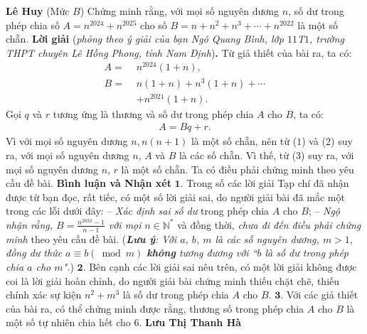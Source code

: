 \begin{multicols}{2}
	\hfill	\textbf{\color{thachthuctoanhoc}Lê Huy}
	\vskip 0.1cm
	{}
	(Mức $B$) Chứng minh rằng, với mọi số nguyên dương $n$, số dư trong phép chia số $A=n^{2024}+n^{2025}$  cho số $B=n+n^2+n^3+\cdots+n^{2022}$ là một số chẵn. 
	\vskip 0.05cm
	\textbf{\color{thachthuctoanhoc}Lời giải} (\textit{phỏng theo ý giải của bạn Ngô Quang Bình, lớp $11$T$1$, trường THPT chuyên Lê Hồng Phong, tỉnh Nam Định})\textbf{\color{thachthuctoanhoc}.}
	\vskip 0.05cm
	Từ giả thiết của bài ra, ta có:
	\begin{align*}
		A = \,\,&{n^{2024}}\left( {1 + n} \right), \tag{$1$}\\
		B = \,\,&n\left( {1 + n} \right) + {n^3}\left( {1 + n} \right) +  \cdots  \\
		&+ {n^{2021}}\left( {1 + n} \right). \tag{$2$}
	\end{align*}
	Gọi $q$ và $r$ tương ứng là thương và số dư trong phép chia $A$ cho $B$, ta có:
	\begin{align*}
		A = Bq + r. \tag{$3$}
	\end{align*}
	Vì với mọi số nguyên dương $n, n(n + 1)$ là một số chẵn, nên từ ($1$) và ($2$) suy ra, với mọi số nguyên dương $n$, $A$ và $B$ là các số chẵn. Vì thế, từ ($3$) suy ra, với mọi số nguyên dương $n$, $r$ là một số chẵn.
	\vskip 0.05cm
	Ta có điều phải chứng minh theo yêu cầu đề bài.
	\vskip 0.05cm
	\textbf{\color{thachthuctoanhoc}Bình luận và Nhận xét}
	\vskip 0.05cm
	$\pmb{1.}$ Trong số các lời giải Tạp chí đã nhận được từ bạn đọc, rất tiếc, có một số lời giải sai, do người giải bài đã mắc một trong các lỗi dưới đây:
	\vskip 0.05cm
	-- \textit{Xác định sai số dư} trong phép chia $A$ cho $B$;
	\vskip 0.05cm
	--\textit{ Ngộ nhận rằng, $B = \frac{{{n^{2023}} - 1}}{{n - 1}}$  với mọi} $n \in \mathbb{N^*}$  và đồng thời, \textit{chưa đi đến điều phải chứng minh} theo yêu cầu đề bài.
	\vskip 0.05cm
	(\textit{\textbf{\color{thachthuctoanhoc}Lưu ý}: Với $a$, $b$, $m$ là các số nguyên dương, $m > 1$, đồng dư thức $a \equiv b\left( {\bmod m} \right)$  \textbf{\color{thachthuctoanhoc}không} tương đương với ``$b$ là số dư trong phép chia $a$ cho $m$".})
	\vskip 0.05cm
	$\pmb{2.}$ Bên cạnh các lời giải sai nêu trên, có một lời giải không được coi là lời giải hoàn chỉnh, do người giải bài chứng minh thiếu chặt chẽ, thiếu chính xác sự kiện $n^2 + m^3$  là số dư trong phép chia $A$ cho $B$.
	\vskip 0.05cm
	$\pmb{3.}$ Với các giả thiết của bài ra, có thể chứng minh được rằng, thương số trong phép chia $A$ cho $B$ là một số tự nhiên chia hết cho $6$.
	\vskip 0.15cm
	\hfill	\textbf{\color{thachthuctoanhoc}Lưu Thị Thanh Hà}

\end{multicols}
